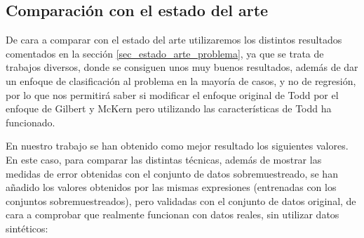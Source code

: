 \subsection{Comparación con el estado del arte}

De cara a comparar con el estado del arte utilizaremos los distintos resultados comentados en la sección \ref{sec_estado_arte_problema}, ya que se trata de trabajos diversos, donde se consiguen unos muy buenos resultados, además de dar un enfoque de clasificación al problema en la mayoría de casos, y no de regresión, por lo que nos permitirá saber si modificar el enfoque original de Todd por el enfoque de Gilbert y McKern pero utilizando las características de Todd ha funcionado.

En nuestro trabajo se han obtenido como mejor resultado los siguientes valores. En este caso, para comparar las distintas técnicas, además de mostrar las medidas de error obtenidas con el conjunto de datos sobremuestreado, se han añadido los valores obtenidos por las mismas expresiones (entrenadas con los conjuntos sobremuestreados), pero validadas con el conjunto de datos original, de cara a comprobar que realmente funcionan con datos reales, sin utilizar datos sintéticos:



